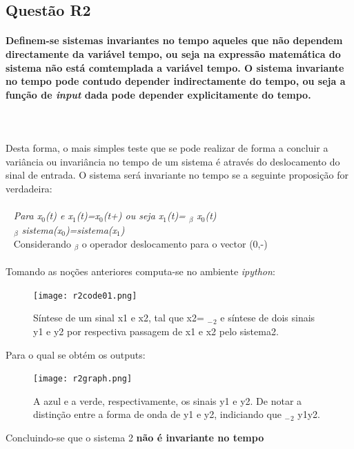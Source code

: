 \documentclass[a4paper,12pt]{article}
\begin{document}
		\subsection{Questão R2}
			\paragraph{Definem-se sistemas invariantes no tempo aqueles que não dependem directamente da variável tempo, ou seja na expressão matemática do sistema não está comtemplada a variável tempo. O sistema invariante no tempo pode contudo depender indirectamente do tempo, ou seja a função de \textit{input} dada pode depender explicitamente do tempo.}
			\mbox{}\\
			\mbox{}\\
			Desta forma, o mais simples teste que se pode realizar de forma a concluir a variância ou invariância no tempo de um sistema é através do deslocamento do sinal de entrada.
			O sistema será invariante no tempo se a seguinte proposição for verdadeira:
			\mbox{}\\
			\mbox{} \\
			\mbox{		} \textit{Para x$_0$(t) e x$_1$(t)=x$_0$(t+\textbeta) ou seja x$_1$(t)= $_\beta$ x$_0$(t)
			\\ 
			\mbox{          } $_\beta$ sistema(x$_0$)=sistema(x$_1$)}
			\mbox{}\\
			\mbox{          } Considerando $_\beta$ o operador deslocamento para o vector (0,-\textbeta)
\mbox{}\\\mbox{}\\
			Tomando as noções anteriores computa-se no ambiente \textit{ipython}:
			\begin{figure}[H]
    				\centering
    				\captionsetup{justification=centering}
    				\texttt{[image: r2code01.png]}
				\caption{Síntese de um sinal x1 e  x2, tal que x2= $_-$$_2$ e síntese de dois sinais y1 e y2 por respectiva passagem de x1 e x2 pelo sistema2.}
    			\end{figure}
			Para o qual se obtém os outputs:
 			\begin{figure}[H]
      				\centering
      				\captionsetup{justification=centering}
      				\texttt{[image: r2graph.png]}
				\caption{A azul e a verde, respectivamente, os sinais y1 e y2. De notar a distinção entre a forma de onda de y1 e y2, indiciando que  $_-$$_2$ y1\neq y2.}
      			\end{figure}
			Concluindo-se que o sistema 2 \textbf{não é invariante no tempo}
	\newpage	
\end{document}
